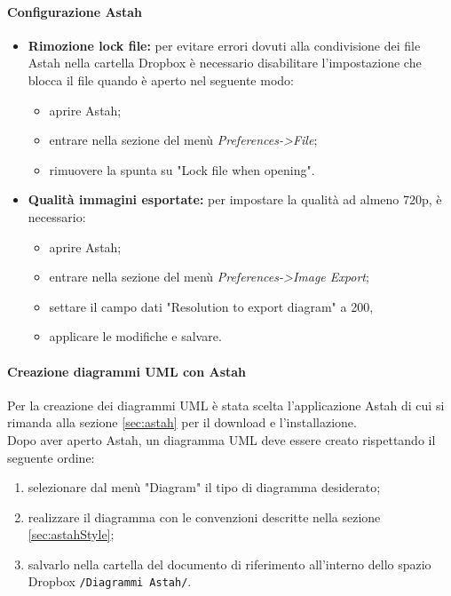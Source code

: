         	\paragraph{Configurazione Astah}
        		\begin{itemize}
        			\item \textbf{Rimozione lock file:} per evitare errori dovuti alla condivisione dei file Astah nella cartella Dropbox è necessario disabilitare l'impostazione che blocca il file quando è aperto nel seguente modo:
        				\begin{itemize}
        					\item aprire Astah;
        					\item entrare nella sezione del menù \textit{Preferences->File};
        					\item rimuovere la spunta su "Lock file when opening".
        				\end{itemize}
        			\item \textbf{Qualità immagini esportate:} per impostare la qualità ad almeno 720p, è necessario:	
        				\begin{itemize}
        					\item aprire Astah;
        					\item entrare nella sezione del menù \textit{Preferences->Image Export};
        					\item settare il campo dati "Resolution to export diagram" a 200,
        					\item applicare le modifiche e salvare.
        				\end{itemize}
        		\end{itemize}
        		
			\paragraph{Creazione diagrammi UML con Astah}
	        Per la creazione dei diagrammi UML è stata scelta l'applicazione Astah di cui si rimanda alla sezione \ref{sec:astah} per il download e l'installazione. \\
			Dopo aver aperto Astah, un diagramma UML deve essere creato rispettando il seguente ordine:
			\begin{enumerate}
				\item selezionare dal menù "Diagram" il tipo di diagramma desiderato;
				\item realizzare il diagramma con le convenzioni descritte nella sezione \ref{sec:astahStyle};
				\item salvarlo nella cartella del documento di riferimento all'interno dello spazio Dropbox \texttt{/Diagrammi Astah/}.
			\end{enumerate}
